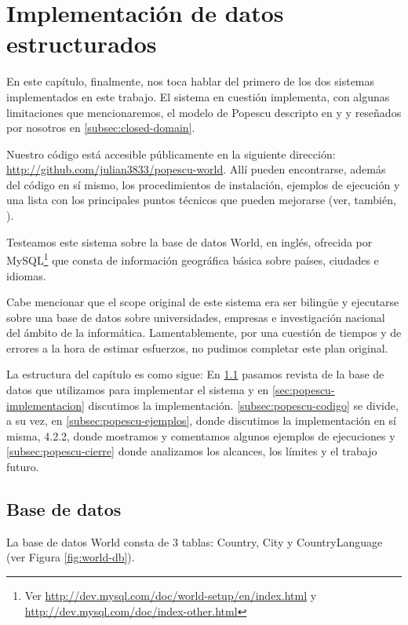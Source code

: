 \chapter{Implementación de datos estructurados}
\label{chap:4}
En este capítulo, finalmente, nos toca hablar del primero de los dos sistemas implementados en este trabajo.
El sistema en cuestión implementa, con algunas limitaciones que mencionaremos, el modelo de Popescu descripto en \cite{QADB1} y \cite{QADB2} y reseñados por nosotros en \ref{subsec:closed-domain}.

Nuestro código está accesible públicamente en la siguiente dirección: \url{http://github.com/julian3833/popescu-world}. Allí pueden encontrarse, además del código en sí mismo, los procedimientos de instalación, ejemplos de ejecución y una lista con los principales puntos técnicos que pueden mejorarse (ver, también, ).

Testeamos este sistema sobre la base de datos World, en inglés, ofrecida por MySQL\footnote{Ver \url{http://dev.mysql.com/doc/world-setup/en/index.html} y \url{http://dev.mysql.com/doc/index-other.html}} que consta de información geográfica básica sobre países, ciudades e idiomas.

Cabe mencionar que el scope original de este sistema era ser bilingüe y ejecutarse sobre una base de datos sobre universidades, empresas e investigación nacional del ámbito de la informática. Lamentablemente, por una cuestión de tiempos y de errores a la hora de estimar esfuerzos, no pudimos completar este plan original.

La estructura del capítulo es como sigue: En \ref{sec:popescu-db} pasamos revista de la base de datos que utilizamos para implementar el sistema y en \ref{sec:popescu-implementacion} discutimos la implementación. \ref{subsec:popescu-codigo} se divide, a su vez, en \ref{subsec:popescu-ejemplos}, donde discutimos la implementación en sí misma, 4.2.2, donde mostramos y comentamos algunos ejemplos de ejecuciones y \ref{subsec:popescu-cierre} donde analizamos los alcances, los límites y el trabajo futuro.


\section{Base de datos}
\label{sec:popescu-db}

La base de datos World consta de 3 tablas: Country, City y CountryLanguage (ver Figura \ref{fig:world-db}).

